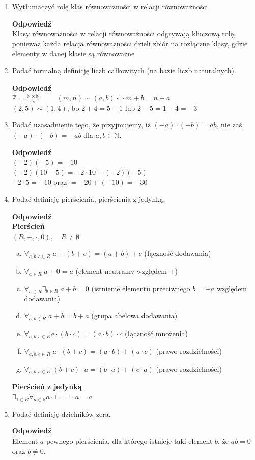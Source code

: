 \documentclass[12pt,a4paper]{article}
\theoremstyle{break}
\newcommand{\Odp}[1]{
		\begin{mdframed}[style=zadanie]
			\textbf{Odpowiedź}\\
			#1
		\end{mdframed}
	}
\begin{document}
\begin{enumerate}[1.]
	\item Wytłumaczyć rolę klas równoważności w relacji równoważności.
	\Odp{
	Klasy równoważności w relacji równoważności odgrywają kluczową rolę, ponieważ każda relacja równoważności dzieli zbiór na rozłączne klasy, gdzie elementy w danej klasie są równoważne
	}
	\newpage
	\item Podać formalną definicję liczb całkowitych (na bazie liczb naturalnych).
	\Odp{
	$\mathbb{Z}=\frac{\mathbb{N}\times\mathbb{N}}{\sim} \qquad$
	$(m,n)\sim (a,b) \Leftrightarrow m+b = n+a$\\
	$(2,5)\sim (1,4)$, bo $2+4=5+1$ lub $2-5=1-4=-3$
	}
	
	\item Podać uzasadnienie tego, że przyjmujemy, iż $(-a)\cdot(-b) = ab$, nie zaś $(-a)\cdot(-b) = -ab$ dla $a, b \in \mathbb{N}$.
	\Odp{
	$(-2)(-5)=-10$\\
	$(-2)(10-5)=-2\cdot10+(-2)(-5)$\\
	$-2\cdot5=-10$ oraz $=-20+(-10)=-30$
	}
	
	\item Podać definicję pierścienia, pierścienia z jedynką.
	\Odp{
		\textbf{Pierścień}\\
		$(R,+,\cdot,0), \quad R\neq\emptyset$
		\begin{enumerate}[a)]
			\item $\forall_{a,b,c\in R}\; a+(b+c)=(a+b)+c$ (łączność dodawania)
			\item $\forall_{a\in R}\; a+0=a$ (element neutralny względem $+$)
			\item $\forall_{a\in R} \exists_{b\in R}\; a+b=0$ (istnienie elementu przeciwnego $b=-a$ względem dodawania)
			\item $\forall_{a,b\in R}\; a+b=b+a$ (grupa abelowa dodawania)
			\item $\forall_{a,b,c\in R} a\cdot(b\cdot c)=(a\cdot b)\cdot c$ (łączność mnożenia)
			\item $\forall_{a,b,c\in R} \; a\cdot(b+c)=(a\cdot b)+ (a\cdot c)$ (prawo rozdzielności)
			\item $\forall_{a,b,c\in R} \; (b+c)\cdot a= (b\cdot a) + (c\cdot a)$ (prawo rozdzielności)
		\end{enumerate}
		
		\textbf{Pierścień z jedynką}\\
		$\exists_{1\in R} \forall_{a\in\mathbb{R}} a\cdot1=1\cdot a=a$
	}
	
	\item Podać definicję dzielników zera.
	\Odp{
		Element $a$ pewnego pierścienia, dla którego istnieje taki element $b$, że $ab=0$ oraz $b\neq 0$.
	}
	

\end{enumerate}
\end{document}
